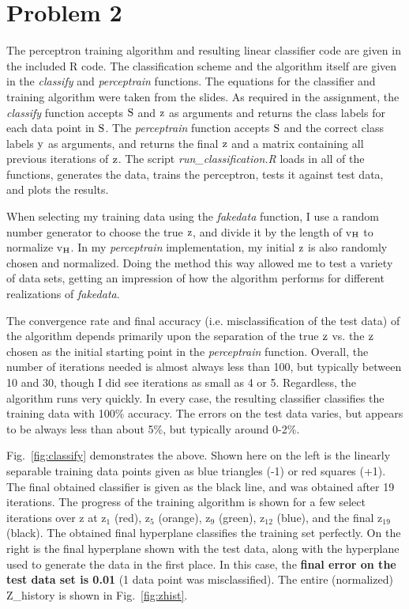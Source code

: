 \documentclass[12pt]{article}%
\begin{document}
\section{Problem 2}
The perceptron training algorithm and resulting linear classifier code are given in the 
included R code. The classification scheme and the algorithm itself are given in the \textit{classify} and \textit{perceptrain} functions. The equations for the classifier and training algorithm were taken from the slides. As required in the assignment, the \textit{classify} function accepts $\rm{S}$ and $\rm{z}$ as arguments and returns the class labels for each data point in $\rm{S}$. The \textit{perceptrain} function accepts $\rm{S}$ and the correct class labels $\rm{y}$ as arguments, and returns the final $\rm{z}$ and a matrix containing all previous iterations of $\rm{z}$. The script \textit{run\_classification.R} loads in all of the functions, generates the data, trains the perceptron, tests it against test data, and plots the results.

When selecting my training data using the \textit{fakedata} function, I use a random number generator to choose the true $\rm{z}$, and divide it by the length of v$_{\rm{H}}$ to normalize v$_{\rm{H}}$. In my \textit{perceptrain} implementation, my initial $\rm{z}$ is also randomly chosen and normalized. Doing the method this way allowed me to test a variety of data sets, getting an impression of how the algorithm performs for different realizations of \textit{fakedata}. 

The convergence rate and final accuracy (i.e. misclassification of the test data) of the algorithm depends primarily upon the separation of the true $\rm{z}$ vs. the $\rm{z}$ chosen as the initial starting point in the \textit{perceptrain} function. Overall, the number of iterations needed is almost always less than 100, but typically between 10 and 30, though I did see iterations as small as 4 or 5. Regardless, the algorithm runs very quickly. In every case, the resulting classifier classifies the training data with 100\% accuracy. The errors on the test data varies, but appears to be always less than about 5\%, but typically around 0-2\%. 

Fig.~\ref{fig:classify} demonstrates the above. Shown here on the left is the linearly separable training data points given as blue triangles (-1) or red squares (+1). The final obtained classifier is given as the black line, and was obtained after 19 iterations. The progress of the training algorithm is shown for a few select iterations over z at z$_1$ (red), z$_5$ (orange), z$_{9}$ (green), z$_{12}$ (blue), and the final z$_{19}$ (black). The obtained final hyperplane classifies the training set perfectly. On the right is the final hyperplane shown with the test data, along with the hyperplane used to generate the data in the first place. In this case, the \textbf{final error on the test data set is 0.01} (1 data point was misclassified). The entire (normalized) Z\_history is shown in Fig.~\ref{fig:zhist}.
\end{document}
